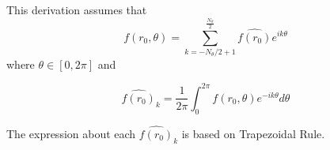 \documentclass[11pt,letterpaper]{article}
\begin{document}
This derivation assumes that
\begin{equation}
f(r_0, \theta) = \sum_{k=-N_\theta/2+1}^{\frac{N_\theta}{2}} \widehat{f(r_0)} e^{ik\theta}
\end{equation}
where $\theta \in [0,2\pi]$ and

\begin{equation}
\widehat{f(r_0)}_k = \frac{1}{2\pi} \int_0^{2\pi} f(r_0, \theta) e^{-ik\theta} d\theta
\end{equation}

The expression about each $\widehat{f(r_0)}_k$ is based on Trapezoidal Rule.
\end{document}

